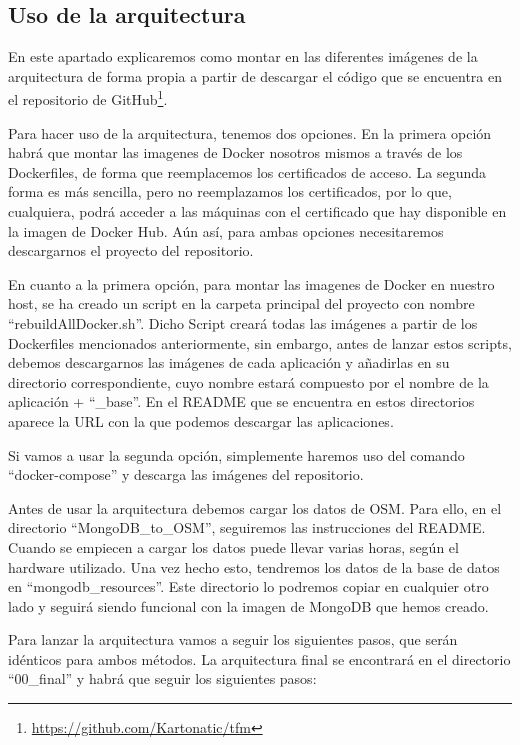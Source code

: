 \subsection {Uso de la arquitectura \label{uso}}

En este apartado explicaremos como montar en las diferentes imágenes de la arquitectura de forma propia a partir de descargar el código que se encuentra en el repositorio de GitHub\footnote{\url{https://github.com/Kartonatic/tfm}}.

Para hacer uso de la arquitectura, tenemos dos opciones. En la primera opción habrá que montar las imagenes de Docker nosotros mismos a través de los Dockerfiles, de forma que reemplacemos los certificados de acceso. La segunda forma es más sencilla, pero no reemplazamos los certificados, por lo que, cualquiera, podrá acceder a las máquinas con el certificado que hay disponible en la imagen de Docker Hub. Aún así, para ambas opciones necesitaremos descargarnos el proyecto del repositorio.

En cuanto a la primera opción, para montar las imagenes de Docker en nuestro host, se ha creado un script en la carpeta principal del proyecto con nombre “rebuildAllDocker.sh”. Dicho Script creará todas las imágenes a partir de los Dockerfiles mencionados anteriormente, sin embargo, antes de lanzar estos scripts, debemos descargarnos las imágenes de cada aplicación y añadirlas en su directorio correspondiente, cuyo nombre estará compuesto por el nombre de la aplicación + “\_base”. En el README que se encuentra en estos directorios aparece la URL con la que podemos descargar las aplicaciones.

Si vamos a usar la segunda opción, simplemente haremos uso del comando “docker-compose” y descarga las imágenes del repositorio.

Antes de usar la arquitectura debemos cargar los datos de OSM. Para ello, en el directorio “MongoDB\_to\_OSM”, seguiremos las instrucciones del README. Cuando se empiecen a cargar los datos puede llevar varias horas, según el hardware utilizado. Una vez hecho esto, tendremos los datos de la base de datos en “mongodb\_resources”. Este directorio lo podremos copiar en cualquier otro lado y seguirá siendo funcional con la imagen de MongoDB que hemos creado.

Para lanzar la arquitectura vamos a seguir los siguientes pasos, que serán idénticos para ambos métodos. La arquitectura final se encontrará en el directorio “00\_final” y habrá que seguir los siguientes pasos:

